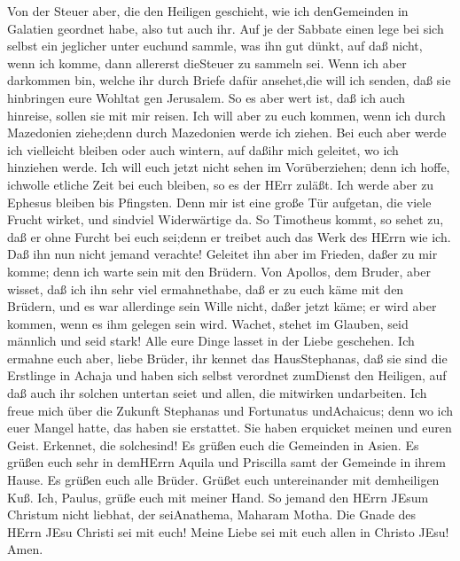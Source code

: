  Von der Steuer aber, die den Heiligen geschieht, wie ich
denGemeinden in Galatien geordnet habe, also tut auch ihr. 
Auf je der Sabbate einen lege bei sich selbst ein jeglicher unter
euchund sammle, was ihn gut dünkt, auf daß nicht, wenn ich komme, dann
allererst dieSteuer zu sammeln sei.  Wenn ich aber darkommen
bin, welche ihr durch Briefe dafür ansehet,die will ich senden, daß sie
hinbringen eure Wohltat gen Jerusalem.  So es aber wert ist,
daß ich auch hinreise, sollen sie mit mir reisen.  Ich will
aber zu euch kommen, wenn ich durch Mazedonien ziehe;denn durch
Mazedonien werde ich ziehen.  Bei euch aber werde ich
vielleicht bleiben oder auch wintern, auf daßihr mich geleitet, wo ich
hinziehen werde.  Ich will euch jetzt nicht sehen im
Vorüberziehen; denn ich hoffe, ichwolle etliche Zeit bei euch bleiben,
so es der HErr zuläßt.  Ich werde aber zu Ephesus bleiben
bis Pfingsten.  Denn mir ist eine große Tür aufgetan, die
viele Frucht wirket, und sindviel Widerwärtige da.  So
Timotheus kommt, so sehet zu, daß er ohne Furcht bei euch sei;denn er
treibet auch das Werk des HErrn wie ich.  Daß ihn nun nicht
jemand verachte! Geleitet ihn aber im Frieden, daßer zu mir komme; denn
ich warte sein mit den Brüdern.  Von Apollos, dem Bruder,
aber wisset, daß ich ihn sehr viel ermahnethabe, daß er zu euch käme mit
den Brüdern, und es war allerdinge sein Wille nicht, daßer jetzt käme;
er wird aber kommen, wenn es ihm gelegen sein wird. 
Wachet, stehet im Glauben, seid männlich und seid stark! 
Alle eure Dinge lasset in der Liebe geschehen.  Ich ermahne
euch aber, liebe Brüder, ihr kennet das HausStephanas, daß sie sind die
Erstlinge in Achaja und haben sich selbst verordnet zumDienst den
Heiligen,  auf daß auch ihr solchen untertan seiet und
allen, die mitwirken undarbeiten.  Ich freue mich über die
Zukunft Stephanas und Fortunatus undAchaicus; denn wo ich euer Mangel
hatte, das haben sie erstattet.  Sie haben erquicket meinen
und euren Geist. Erkennet, die solchesind!  Es grüßen euch
die Gemeinden in Asien. Es grüßen euch sehr in demHErrn Aquila und
Priscilla samt der Gemeinde in ihrem Hause.  Es grüßen euch
alle Brüder. Grüßet euch untereinander mit demheiligen Kuß.
 Ich, Paulus, grüße euch mit meiner Hand.  So
jemand den HErrn JEsum Christum nicht liebhat, der seiAnathema, Maharam
Motha.  Die Gnade des HErrn JEsu Christi sei mit euch!
 Meine Liebe sei mit euch allen in Christo JEsu! Amen.
